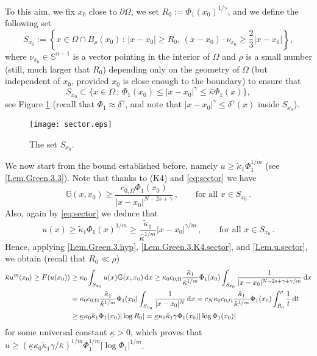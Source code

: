 \documentclass[11pt]{article}
\numberwithin{equation}{section}
\newcommand{\dx}{\,{\rm d}x}
\newcommand{\dt}{\,{\rm d}t}
\newcommand{\n}{F}
\newcommand{\ka}{\overline{\kappa}}
\newcommand{\kb}{\underline{\kappa}}
\newcommand{\K}{{\mathbb G}}
\begin{document}
To this aim, we fix $x_0$ close to $\partial\Omega$, we set $R_0:=\Phi_1(x_0)^{1/\gamma}$, and we define the following set
$$
S_{x_0}:=\left\{x \in \Omega\cap B_\rho(x_0)\,:\,|x-x_0|\geq R_0,\, (x-x_0)\cdot \nu_{x_0}\geq \textstyle{\frac23}|x-x_0|\right\},
$$
where $\nu_{x_0}\in \mathbb S^{n-1}$ is a vector pointing in the interior of $\Omega$ and $\rho$ is a small number (still, much larger that $R_0$) depending only on the geometry of $\Omega$ (but independent of $x_0$, provided $x_0$ is close enough to the boundary) to ensure that
\begin{equation}
\label{eq:sector}
S_{x_0}\subset \{x \in \Omega\,:\,\Phi_1(x_0)\leq |x-x_0|^\gamma \leq \hat \kappa\Phi_1(x)\},
\end{equation}
see Figure \ref{fig:sector} (recall that $\Phi_1\approx \delta^\gamma$,
and note that $|x-x_0|^\gamma\leq \delta^\gamma(x)$ inside $S_{x_0}$).
\begin{figure}[h]
\center \texttt{[image: sector.eps]}
\caption{The set $S_{x_0}$.}
\label{fig:sector}
\end{figure}
We now start from the bound established before, namely $u \geq \tilde\kappa_1 \Phi_1^{1/m}$ (see \eqref{Lem.Green.3.3}).
Note that thanks to (K4) and \eqref{eq:sector} we have
\begin{equation}\label{Lem.Green.3.K4.sector}
\K(x,x_0)\ge \frac{c_{0,\Omega} \Phi_1(x_0)}{|x-x_0|^{N-2s+\gamma}}\,,\qquad\mbox{for all }x\in S_{x_0}\,.
\end{equation}
Also, again by \eqref{eq:sector}
we deduce that
\begin{equation}\label{Lem.u.sector}
u(x) \geq \tilde\kappa_1 \Phi_1(x)^{1/m}\geq \frac{\tilde\kappa_1}{\hat \kappa^{1/m}}|x-x_0|^{\gamma/m} \,,\qquad\mbox{for all }x\in S_{x_0}\,.
\end{equation}
Hence, applying \eqref{Lem.Green.3.hyp}, \eqref{Lem.Green.3.K4.sector},
and \eqref{Lem.u.sector}, we obtain (recall that $R_0 \ll \rho$)
\begin{align*}
\ka u^m(x_0) \ge \n(u(x_0)) &\geq \kappa_0 \int_{S_{x_0}}u(x)\K(x,x_0)\dx
\geq \kappa_0c_{0,\Omega}\frac{\tilde\kappa_1}{\hat \kappa^{1/m}}\Phi_1(x_0)\int_{S_{x_0}}\frac{1}{|x-x_0|^{N-2s+\gamma+\gamma/m}}\dx\\
&=\kappa_0c_{0,\Omega}\frac{\tilde\kappa_1}{\hat \kappa^{1/m}}\Phi_1(x_0)\int_{S_{x_0}}\frac{1}{|x-x_0|^{N}}\dx=c_N\kappa_0c_{0,\Omega}\frac{\tilde\kappa_1}{\hat \kappa^{1/m}}\Phi_1(x_0)\int_{R_0}^\rho \frac{1}{t}\dt\\
&\geq \kb\kappa_0 \tilde\kappa_1 \Phi_1(x_0)|\log R_0| =\kb \kappa_0\tilde\kappa_1   \gamma \Phi_1(x_0)|\log \Phi_1(x_0)|
\end{align*}
for some universal constant $\kb>0$,
which proves that $u \geq (\kb \kappa_0\tilde\kappa_1\gamma/\ka)^{1/m} \Phi_1^{1/m}|\log \Phi_1|^{1/m}$.
\end{document}
